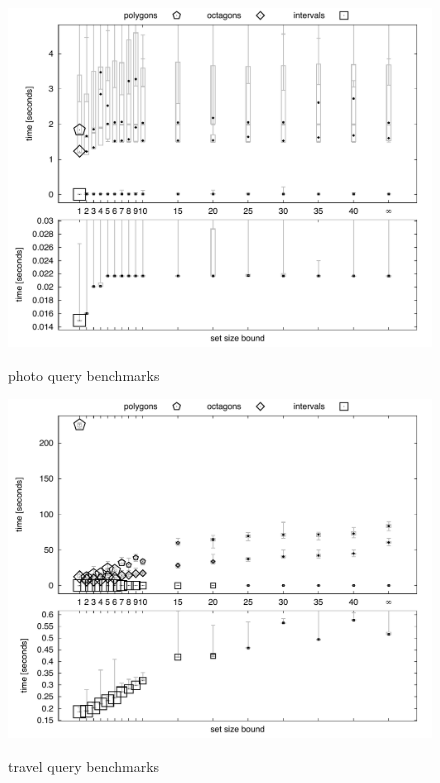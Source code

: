 \begin{figure}[t!]
\scriptsize
\centering
\includegraphics[width=12.5cm]{figures/plot_domains_photo.pdf} \\
\caption{photo query benchmarks}
\label{fig:bench_domains_photo}
\end{figure}

\begin{figure}[t!]
\scriptsize
\centering
\includegraphics[width=12.5cm]{figures/plot_domains_travel.pdf} \\
\caption{travel query benchmarks}
\label{fig:bench_domains_travel}
\end{figure}

